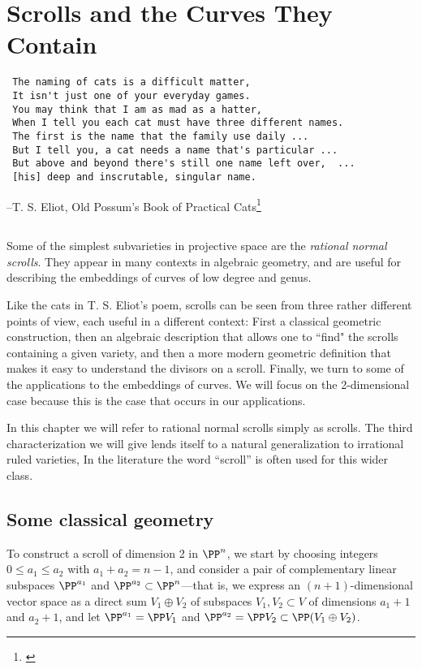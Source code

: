 

\chapter{Scrolls and the Curves They Contain}
\label{ScrollsChapter}


\begin{verbatim}
 The naming of cats is a difficult matter,
 It isn't just one of your everyday games.
 You may think that I am as mad as a hatter,
 When I tell you each cat must have three different names.
 The first is the name that the family use daily ...
 But I tell you, a cat needs a name that's particular ...
 But above and beyond there's still one name left over,  ...
 [his] deep and inscrutable, singular name.
\end{verbatim}
--T. S. Eliot, Old Possum's Book of Practical Cats\footnote{\cite{PracticalCats}}

\section*{}
Some of the simplest subvarieties in projective space are the \emph{rational normal scrolls}. They appear in many contexts in algebraic geometry, and are useful for describing the embeddings of curves of low degree and genus. 

Like the cats in T. S. Eliot's poem, scrolls can be seen from three rather different points of view, each useful in a different context: First a classical geometric construction, then an algebraic description that allows one to ``find" the scrolls containing a given variety, and then a more modern geometric definition that makes it easy to understand the divisors on a scroll. Finally, we turn to some of the applications to the embeddings of curves. We will focus on the 2-dimensional case because this is the case that occurs in our applications.

In this chapter we will refer to rational normal scrolls simply as scrolls. The third characterization we will give lends itself to a natural generalization to  irrational ruled varieties, In the literature the word ``scroll'' is often used for this wider class.

\section{Some classical geometry}\label{daily name}

To construct a scroll of dimension 2 in $\PP^n$, we start by choosing integers $0\leq a_1 \leq a_2$ with $a_1 + a_2 = n-1$, and consider  a pair of complementary linear subspaces $\PP^{a_1}$ and $\PP^{a_2} \subset \PP^n$---that is, we express an $(n+1)$-dimensional vector space as a direct sum $ V_1 \oplus V_2$ of subspaces $V_1, V_2 \subset V$ of dimensions $a_1+1$ and $a_2+1$, and let $\PP^{a_1} = \PP V_1$ and $\PP^{a_2} = \PP V_2 \subset \PP (V_1\oplus V_2)$.

